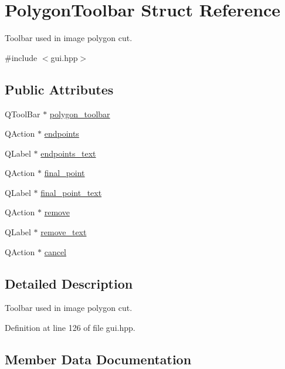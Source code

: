 \hypertarget{structPolygonToolbar}{}\section{Polygon\+Toolbar Struct Reference}
\label{structPolygonToolbar}


Toolbar used in image polygon cut.  




{\ttfamily \#include $<$gui.\+hpp$>$}

\subsection*{Public Attributes}
\begin{DoxyCompactItemize}
\item 
Q\+Tool\+Bar $\ast$ \mbox{\hyperlink{structPolygonToolbar_a5388c77217c5bea7075cf234c508b8d6}{polygon\+\_\+toolbar}}
\item 
Q\+Action $\ast$ \mbox{\hyperlink{structPolygonToolbar_a78a569efc30754e02b7d8f5d74ede0ec}{endpoints}}
\item 
Q\+Label $\ast$ \mbox{\hyperlink{structPolygonToolbar_a4ab3ad9905d894a2f166a4e1cbfb9e3a}{endpoints\+\_\+text}}
\item 
Q\+Action $\ast$ \mbox{\hyperlink{structPolygonToolbar_a25d471a6081bfa4107d5f1cd9a61d243}{final\+\_\+point}}
\item 
Q\+Label $\ast$ \mbox{\hyperlink{structPolygonToolbar_a3af92f094b85ad63be4d9dcf37a88fa8}{final\+\_\+point\+\_\+text}}
\item 
Q\+Action $\ast$ \mbox{\hyperlink{structPolygonToolbar_ad5f83fc2ac8daf17ae3014d05d3f5d5b}{remove}}
\item 
Q\+Label $\ast$ \mbox{\hyperlink{structPolygonToolbar_ad396d8e37e491bb7bfa8bf91d318014c}{remove\+\_\+text}}
\item 
Q\+Action $\ast$ \mbox{\hyperlink{structPolygonToolbar_aea894e742da9051f58af268c43212a22}{cancel}}
\end{DoxyCompactItemize}


\subsection{Detailed Description}
Toolbar used in image polygon cut. 

Definition at line 126 of file gui.\+hpp.



\subsection{Member Data Documentation}
\mbox{\label{structPolygonToolbar_aea894e742da9051f58af268c43212a22}} 
